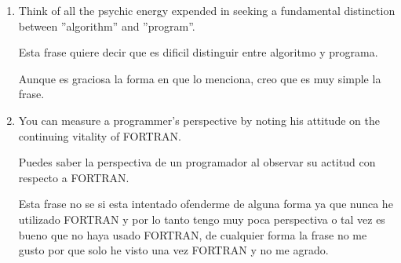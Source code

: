 \documentclass{article}
\begin{document}
\begin{enumerate}
    \item Think of all the psychic energy expended in seeking a fundamental distinction between ”algorithm” and ”program”.

    Esta frase quiere decir que es dificil distinguir entre algoritmo y programa.

    Aunque es graciosa la forma en que lo menciona, creo que es muy simple la frase.
    
    \item You can measure a programmer’s perspective by noting his attitude on the continuing vitality of FORTRAN.

    Puedes saber la perspectiva de un programador al observar su actitud con respecto a FORTRAN.

    Esta frase no se si esta intentado ofenderme de alguna forma ya que nunca he utilizado FORTRAN y por lo tanto tengo muy poca perspectiva o tal vez es bueno que no haya usado FORTRAN, de cualquier forma la frase no me gusto por que solo he visto una vez FORTRAN y no me agrado.


\end{enumerate}
\end{document}
